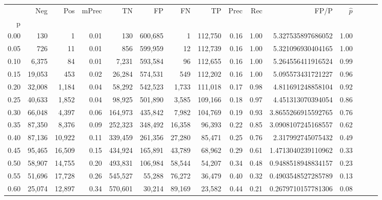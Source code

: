 \begin{tabular}{rrrrrrrrrrrrrrr}
\toprule
{} &     Neg &     Pos & mPrec &       TN &       FP &       FN &       TP &  Prec &   Rec &                   FP/P & $\hat{p}$ \\
p    &         &         &       &          &          &          &          &       &       &                        &           \\
\midrule
0.00 &     130 &       1 &  0.01 &      130 &  600,685 &        1 &  112,750 &  0.16 &  1.00 &      5.327535897686052 &      1.00 \\
0.05 &     726 &      11 &  0.01 &      856 &  599,959 &       12 &  112,739 &  0.16 &  1.00 &      5.321096930404165 &      1.00 \\
0.10 &   6,375 &      84 &  0.01 &    7,231 &  593,584 &       96 &  112,655 &  0.16 &  1.00 &      5.264556411916524 &      0.99 \\
0.15 &  19,053 &     453 &  0.02 &   26,284 &  574,531 &      549 &  112,202 &  0.16 &  1.00 &      5.095573431721227 &      0.96 \\
0.20 &  32,008 &   1,184 &  0.04 &   58,292 &  542,523 &    1,733 &  111,018 &  0.17 &  0.98 &      4.811691248858104 &      0.92 \\
0.25 &  40,633 &   1,852 &  0.04 &   98,925 &  501,890 &    3,585 &  109,166 &  0.18 &  0.97 &      4.451313070394054 &      0.86 \\
0.30 &  66,048 &   4,397 &  0.06 &  164,973 &  435,842 &    7,982 &  104,769 &  0.19 &  0.93 &     3.8655266915592765 &      0.76 \\
0.35 &  87,350 &   8,376 &  0.09 &  252,323 &  348,492 &   16,358 &   96,393 &  0.22 &  0.85 &     3.0908107245168557 &      0.62 \\
0.40 &  87,136 &  10,922 &  0.11 &  339,459 &  261,356 &   27,280 &   85,471 &  0.25 &  0.76 &      2.317992745075432 &      0.49 \\
0.45 &  95,465 &  16,509 &  0.15 &  434,924 &  165,891 &   43,789 &   68,962 &  0.29 &  0.61 &     1.4713040239110962 &      0.33 \\
0.50 &  58,907 &  14,755 &  0.20 &  493,831 &  106,984 &   58,544 &   54,207 &  0.34 &  0.48 &     0.9488518948834157 &      0.23 \\
0.55 &  51,696 &  17,728 &  0.26 &  545,527 &   55,288 &   76,272 &   36,479 &  0.40 &  0.32 &     0.4903548527285789 &      0.13 \\
0.60 &  25,074 &  12,897 &  0.34 &  570,601 &   30,214 &   89,169 &   23,582 &  0.44 &  0.21 &     0.2679710157781306 &      0.08 \\

\end{tabular}

